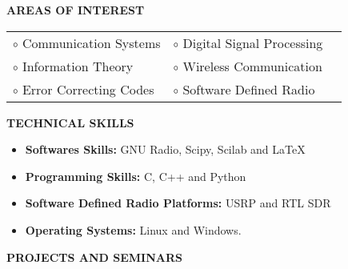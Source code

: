 \documentclass[a4paper,10pt]{article}
\begin{document}
{\qquad \\ \\ \\ \\ \\ \\ \\ \\ \\ \\}

  \colorbox{titleColor}{\parbox{6.5in}{\textbf{AREAS OF INTEREST}}}

    \begin{tabular}{p{3.5in}p{5in}p{2in}}
      $\circ$ Communication Systems	&$\circ$ Digital Signal Processing \\
      $\circ$ Information Theory	&$\circ$ Wireless Communication \\
      $\circ$ Error Correcting Codes	&$\circ$ Software Defined Radio \\
    \end{tabular}

  \colorbox{titleColor}{\parbox{6.5in}{\textbf{TECHNICAL SKILLS}}}
  
    \begin{itemize}
      \setlength{\itemsep}{1pt}
      \item \textbf{{Softwares Skills:}} GNU Radio, Scipy, Scilab and \LaTeX
      \item \textbf{{Programming Skills:}} C, C++ and Python
      \item \textbf{{Software Defined Radio Platforms:}} USRP and RTL SDR
      \item \textbf{{Operating Systems:}} Linux and Windows.
    \end{itemize}

  \colorbox{titleColor}{\parbox{6.5in}{\textbf{PROJECTS AND SEMINARS}}}
\end{document}
